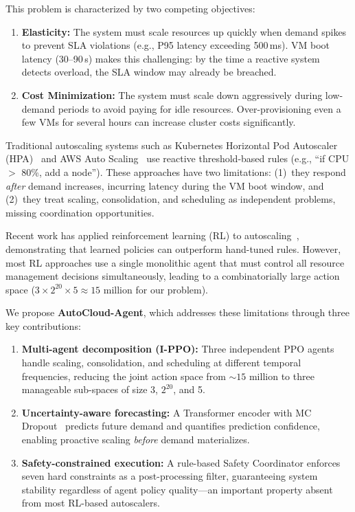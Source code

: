 \documentclass[conference]{IEEEtran}
\begin{document}
This problem is characterized by two competing objectives:
\begin{enumerate}
  \item \textbf{Elasticity:} The system must scale resources up quickly when
        demand spikes to prevent SLA violations (e.g., P95 latency exceeding
        500\,ms).  VM boot latency (30--90\,s) makes this challenging: by the
        time a reactive system detects overload, the SLA window may already be
        breached.
  \item \textbf{Cost Minimization:} The system must scale down aggressively
        during low-demand periods to avoid paying for idle resources.
        Over-provisioning even a few VMs for several hours can increase
        cluster costs significantly.
\end{enumerate}

Traditional autoscaling systems such as Kubernetes Horizontal Pod Autoscaler
(HPA)~\cite{k8s_hpa} and AWS Auto Scaling~\cite{aws_autoscaling} use reactive
threshold-based rules (e.g., ``if CPU $>$ 80\%, add a node''). These approaches
have two limitations: (1)~they respond \textit{after} demand increases,
incurring latency during the VM boot window, and (2)~they treat scaling,
consolidation, and scheduling as independent problems, missing coordination
opportunities.

Recent work has applied reinforcement learning (RL) to
autoscaling~\cite{zhang2023aware, mao2016resource, qiu2020firm,
tirmazi2020borg}, demonstrating that learned policies can outperform hand-tuned
rules. However, most RL approaches use a single monolithic agent that must
control all resource management decisions simultaneously, leading to a
combinatorially large action space ($3 \times 2^{20} \times 5 \approx 15$
million for our problem).

We propose \textbf{AutoCloud-Agent}, which addresses these limitations through
three key contributions:
\begin{enumerate}
  \item \textbf{Multi-agent decomposition (I-PPO):} Three independent PPO
        agents handle scaling, consolidation, and scheduling at different
        temporal frequencies, reducing the joint action space from ${\sim}15$
        million to three manageable sub-spaces of size 3, $2^{20}$, and 5.
  \item \textbf{Uncertainty-aware forecasting:} A Transformer encoder with MC
        Dropout~\cite{gal2016dropout} predicts future demand and quantifies
        prediction confidence, enabling proactive scaling \emph{before} demand
        materializes.
  \item \textbf{Safety-constrained execution:} A rule-based Safety Coordinator
        enforces seven hard constraints as a post-processing filter,
        guaranteeing system stability regardless of agent policy quality---an
        important property absent from most RL-based autoscalers.
\end{enumerate}
\end{document}
